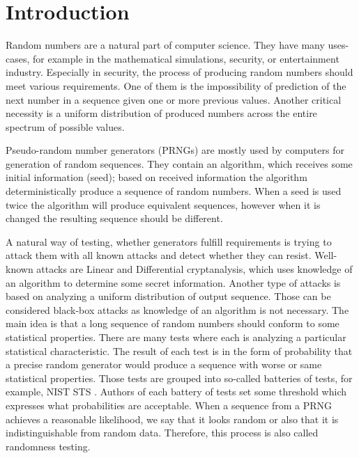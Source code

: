 \documentclass[
    digital,    %
    oneside,    %
    color,
    11pt,
    nocover,
    notable,
    nolof,
    nolot,
    final
]{fithesis3}
\renewcommand\_{\textunderscore\allowbreak}
\begin{document}
\setlength{\parskip}{5pt}
\setlength{\parindent}{0pt}

\newtheorem{theorem}{Theorem}[section] %
                               
\newtheorem{formula}[theorem]{Formula}     %

\chapter{Introduction}
\label{chap:introduction}

Random numbers are a natural part of computer science. They have many uses-cases, for example in the mathematical simulations, security, or entertainment industry. Especially in security, the process of producing random numbers should meet various requirements. One of them is the impossibility of prediction of the next number in a sequence given one or more previous values. Another critical necessity is a uniform distribution of produced numbers across the entire spectrum of possible values. 

Pseudo-random number generators (PRNGs) are mostly used by computers for generation of random sequences. They contain an algorithm, which receives some initial information (seed); based on received information the algorithm deterministically produce a sequence of random numbers. When a seed is used twice the algorithm will produce equivalent sequences, however when it is changed the resulting sequence should be different. 

A natural way of testing, whether generators fulfill requirements is trying to attack them with all known attacks and detect whether they can resist. Well-known attacks are Linear and Differential cryptanalysis, which uses knowledge of an algorithm to determine some secret information. Another type of attacks is based on analyzing a uniform distribution of output sequence. Those can be considered black-box attacks as knowledge of an algorithm is not necessary. The main idea is that a long sequence of random numbers should conform to some statistical properties. There are many tests where each is analyzing a particular statistical characteristic. The result of each test is in the form of probability that a precise random generator would produce a sequence with worse or same statistical properties. Those tests are grouped into so-called batteries of tests, for example, NIST STS \cite{nist-sts}. Authors of each battery of tests set some threshold which expresses what probabilities are acceptable. When a sequence from a PRNG achieves a reasonable likelihood, we say that it looks random or also that it is indistinguishable from random data. Therefore, this process is also called randomness testing.
\end{document}
